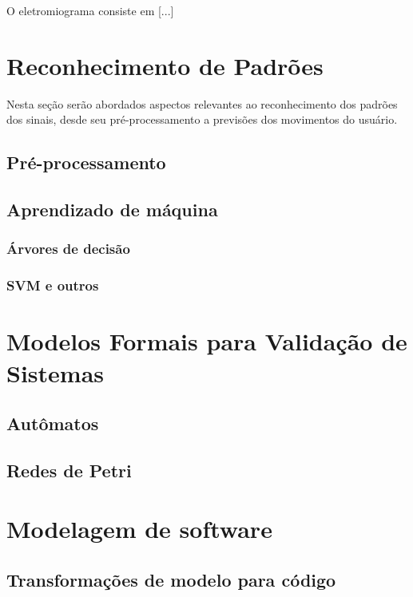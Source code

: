 O eletromiograma consiste em [...]


\section{Reconhecimento de Padrões}
\label{patternrec}
Nesta seção serão abordados aspectos relevantes ao reconhecimento dos padrões dos sinais, desde seu pré-processamento a previsões dos movimentos do usuário.
\subsection{Pré-processamento}
\subsection{Aprendizado de máquina}
\subsubsection{Árvores de decisão}
\subsubsection{SVM e outros}


\section{Modelos Formais para Validação de Sistemas}
\label{sec:modelosformais}
\subsection{Autômatos}
\subsection{Redes de Petri}

\section{Modelagem de software}
\label{sec:modelagem}
\subsection{Transformações de modelo para código}